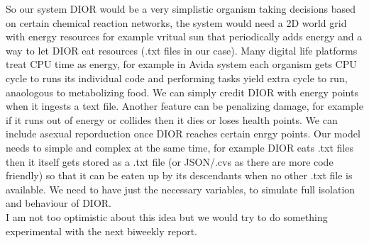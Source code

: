 \documentclass[12pt,a4paper]{article}
\begin{document}
So our system DIOR would be a very simplistic organism taking decisions based on certain chemical reaction networks, the system would need a 2D world grid with energy resources for example vritual sun that periodically adds energy and a way to let DIOR eat resources (.txt files in our case). Many digital life platforms treat CPU time as energy, for example in Avida system each organism gets CPU cycle to runs its individual code and performing tasks yield extra cycle to run, anaologous to metabolizing food. We can simply credit DIOR with energy points when it ingests a text file. Another feature can be penalizing damage, for example if it runs out of energy or collides then it dies or loses health points. We can include asexual reporduction once DIOR reaches certain enrgy points. Our model needs to simple and complex at the same time, for example DIOR eats .txt files then it itself gets stored as a .txt file (or JSON/.cvs as there are more code friendly) so that it can be eaten up by its descendants when no other .txt file is available. We need to have just the necessary variables, to simulate full isolation and behaviour of DIOR.\\
I am not too optimistic about this idea but we would try to do something experimental with the next biweekly report.
\end{document}
